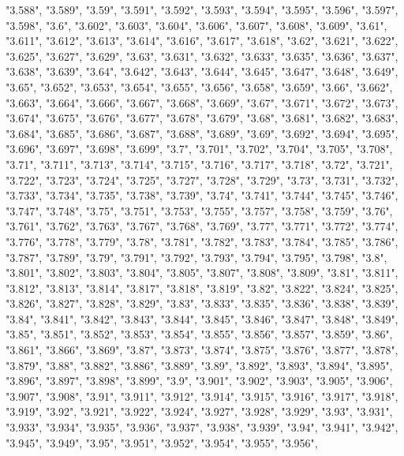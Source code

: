 \documentclass[]{article}
\begin{document}
\begin{itemize}
  "3.588", "3.589", "3.59", "3.591", "3.592", "3.593", "3.594", "3.595",
  "3.596", "3.597", "3.598", "3.6", "3.602", "3.603", "3.604", "3.606",
  "3.607", "3.608", "3.609", "3.61", "3.611", "3.612", "3.613", "3.614",
  "3.616", "3.617", "3.618", "3.62", "3.621", "3.622", "3.625", "3.627",
  "3.629", "3.63", "3.631", "3.632", "3.633", "3.635", "3.636", "3.637",
  "3.638", "3.639", "3.64", "3.642", "3.643", "3.644", "3.645", "3.647",
  "3.648", "3.649", "3.65", "3.652", "3.653", "3.654", "3.655", "3.656",
  "3.658", "3.659", "3.66", "3.662", "3.663", "3.664", "3.666", "3.667",
  "3.668", "3.669", "3.67", "3.671", "3.672", "3.673", "3.674", "3.675",
  "3.676", "3.677", "3.678", "3.679", "3.68", "3.681", "3.682", "3.683",
  "3.684", "3.685", "3.686", "3.687", "3.688", "3.689", "3.69", "3.692",
  "3.694", "3.695", "3.696", "3.697", "3.698", "3.699", "3.7", "3.701",
  "3.702", "3.704", "3.705", "3.708", "3.71", "3.711", "3.713", "3.714",
  "3.715", "3.716", "3.717", "3.718", "3.72", "3.721", "3.722", "3.723",
  "3.724", "3.725", "3.727", "3.728", "3.729", "3.73", "3.731", "3.732",
  "3.733", "3.734", "3.735", "3.738", "3.739", "3.74", "3.741", "3.744",
  "3.745", "3.746", "3.747", "3.748", "3.75", "3.751", "3.753", "3.755",
  "3.757", "3.758", "3.759", "3.76", "3.761", "3.762", "3.763", "3.767",
  "3.768", "3.769", "3.77", "3.771", "3.772", "3.774", "3.776", "3.778",
  "3.779", "3.78", "3.781", "3.782", "3.783", "3.784", "3.785", "3.786",
  "3.787", "3.789", "3.79", "3.791", "3.792", "3.793", "3.794", "3.795",
  "3.798", "3.8", "3.801", "3.802", "3.803", "3.804", "3.805", "3.807",
  "3.808", "3.809", "3.81", "3.811", "3.812", "3.813", "3.814", "3.817",
  "3.818", "3.819", "3.82", "3.822", "3.824", "3.825", "3.826", "3.827",
  "3.828", "3.829", "3.83", "3.833", "3.835", "3.836", "3.838", "3.839",
  "3.84", "3.841", "3.842", "3.843", "3.844", "3.845", "3.846", "3.847",
  "3.848", "3.849", "3.85", "3.851", "3.852", "3.853", "3.854", "3.855",
  "3.856", "3.857", "3.859", "3.86", "3.861", "3.866", "3.869", "3.87",
  "3.873", "3.874", "3.875", "3.876", "3.877", "3.878", "3.879", "3.88",
  "3.882", "3.886", "3.889", "3.89", "3.892", "3.893", "3.894", "3.895",
  "3.896", "3.897", "3.898", "3.899", "3.9", "3.901", "3.902", "3.903",
  "3.905", "3.906", "3.907", "3.908", "3.91", "3.911", "3.912", "3.914",
  "3.915", "3.916", "3.917", "3.918", "3.919", "3.92", "3.921", "3.922",
  "3.924", "3.927", "3.928", "3.929", "3.93", "3.931", "3.933", "3.934",
  "3.935", "3.936", "3.937", "3.938", "3.939", "3.94", "3.941", "3.942",
  "3.945", "3.949", "3.95", "3.951", "3.952", "3.954", "3.955", "3.956",

\end{itemize}
\end{document}
